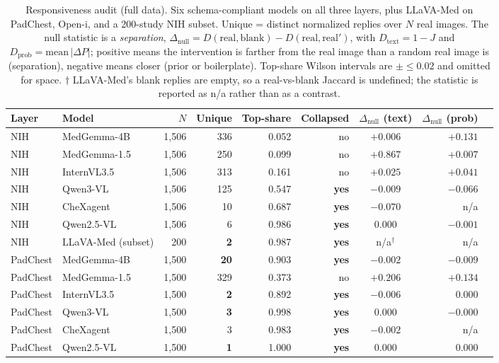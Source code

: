 \begin{table}[H]
\centering
\footnotesize
\caption{Responsiveness audit (full data). Six schema-compliant models on all three layers, plus LLaVA-Med on PadChest, Open-i, and a 200-study NIH subset. Unique = distinct normalized replies over $N$ real images. The null statistic is a \emph{separation}, $\Delta_{\text{null}} = D(\text{real},\text{blank}) - D(\text{real},\text{real}')$, with $D_{\text{text}} = 1-J$ and $D_{\text{prob}} = \text{mean}\,|\Delta P|$; positive means the intervention is farther from the real image than a random real image is (separation), negative means closer (prior or boilerplate). Top-share Wilson intervals are $\pm\le 0.02$ and omitted for space. $\dagger$ LLaVA-Med's blank replies are empty, so a real-vs-blank Jaccard is undefined; the statistic is reported as n/a rather than as a contrast.}
\label{tab:audit}
\begin{tabular}{llrrrrcrr}
\toprule
Layer & Model & $N$ & Unique & Top-share & Collapsed & $\Delta_{\text{null}}$ (text) & $\Delta_{\text{null}}$ (prob) \\
\midrule
NIH & MedGemma-4B & 1,506 & 336 & 0.052 & no & $+0.006$ & $+0.131$ \\
NIH & MedGemma-1.5 & 1,506 & 250 & 0.099 & no & $+0.867$ & $+0.007$ \\
NIH & InternVL3.5 & 1,506 & 313 & 0.161 & no & $+0.025$ & $+0.041$ \\
NIH & Qwen3-VL & 1,506 & 125 & 0.547 & \textbf{yes} & $-0.009$ & $-0.066$ \\
NIH & CheXagent & 1,506 & 10 & 0.687 & \textbf{yes} & $-0.070$ & n/a \\
NIH & Qwen2.5-VL & 1,506 & 6 & 0.986 & \textbf{yes} & $0.000$ & $-0.001$ \\
NIH & LLaVA-Med (subset) & 200 & \textbf{2} & 0.987 & \textbf{yes} & n/a$^{\dagger}$ & n/a \\
\midrule
PadChest & MedGemma-4B & 1,500 & \textbf{20} & 0.903 & \textbf{yes} & $-0.002$ & $-0.009$ \\
PadChest & MedGemma-1.5 & 1,500 & 329 & 0.373 & no & $+0.206$ & $+0.134$ \\
PadChest & InternVL3.5 & 1,500 & \textbf{2} & 0.892 & \textbf{yes} & $-0.006$ & $0.000$ \\
PadChest & Qwen3-VL & 1,500 & \textbf{3} & 0.998 & \textbf{yes} & $0.000$ & $-0.000$ \\
PadChest & CheXagent & 1,500 & 3 & 0.983 & \textbf{yes} & $-0.002$ & n/a \\
PadChest & Qwen2.5-VL & 1,500 & \textbf{1} & 1.000 & \textbf{yes} & $0.000$ & $0.000$ \\

\end{tabular}
\end{table}
